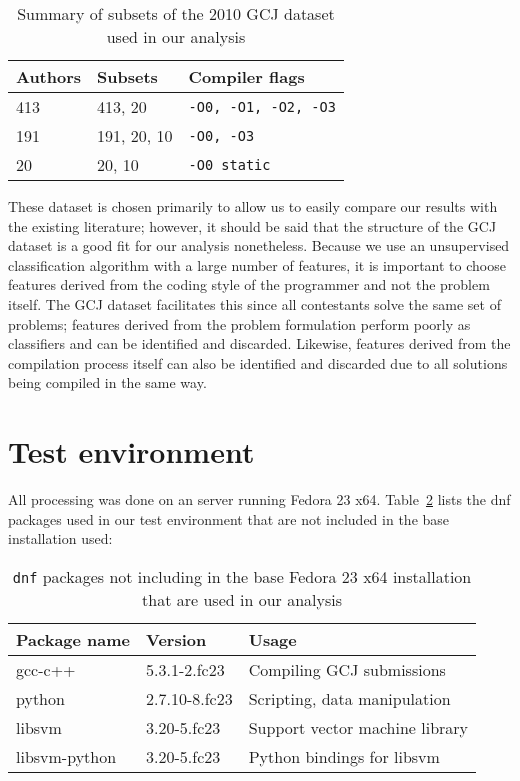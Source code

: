 \documentclass[a4paper,11pt]{kth-mag}
\begin{document}
\begin{table}[!htb]
    \centering
        \begin{tabular}{ l l l }
        Authors & Subsets & Compiler flags \\ \hline
        413 & 413, 20 &  \lstinline{-O0, -O1, -O2, -O3} \\ 
        191 & 191, 20, 10 &  \lstinline{-O0, -O3} \\ 
        20 & 20, 10 &  \lstinline{-O0 static} 
        \end{tabular}
    \caption{Summary of subsets of the 2010 GCJ dataset used in our analysis}
    \label{tab:datasets-summary}
\end{table}

These dataset is chosen primarily to allow us to easily compare our results
with the existing literature; however, it should be said that the structure of
the GCJ dataset is a good fit for our analysis nonetheless. Because we use an
unsupervised classification algorithm with a large number of features, it is
important to choose features derived from the coding style of the programmer
and not the problem itself. The GCJ dataset facilitates this since all
contestants solve the same set of problems; features derived from the problem
formulation perform poorly as classifiers and can be identified and discarded.
Likewise, features derived from the compilation process itself can also be
identified and discarded due to all solutions being compiled in the same way.

\section{Test environment}
All processing was done on an server running Fedora 23 x64.
Table~\ref{tab:dnf-packages} lists the dnf packages used in our test
environment that are not included in the base installation used:

\begin{table}[!htb]
    \centering
        \begin{tabular}{ l l l }
        Package name & Version & Usage \\ \hline
        gcc-c++ & 5.3.1-2.fc23 & Compiling GCJ submissions \\
        python & 2.7.10-8.fc23 & Scripting, data manipulation \\
        libsvm & 3.20-5.fc23  & Support vector machine library \\
        libsvm-python & 3.20-5.fc23 & Python bindings for libsvm
        \end{tabular}
    \caption{\lstinline{dnf} packages not including in the base Fedora 23 x64
    installation that are used in our analysis}
    \label{tab:dnf-packages}
\end{table}
\end{document}
